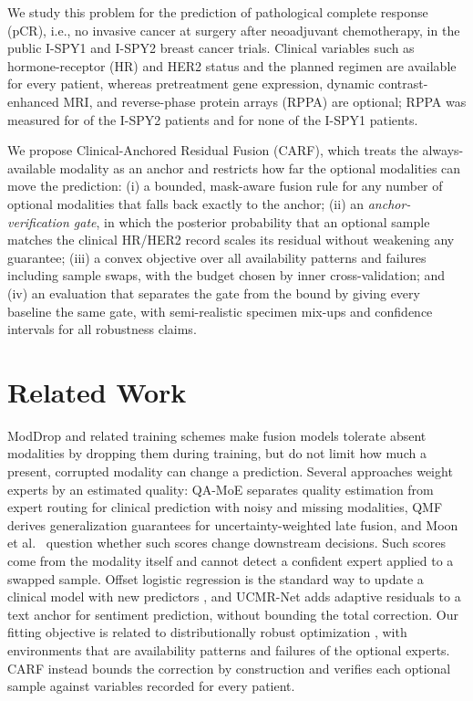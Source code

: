 \documentclass[a4paper,runningheads]{llncs}
\begin{document}
We study this problem for the prediction of pathological complete response (pCR), i.e., no invasive cancer at surgery after neoadjuvant chemotherapy, in the public I-SPY1 \cite{esserman2012} and I-SPY2 \cite{wolf2022ispy} breast cancer trials. Clinical variables such as hormone-receptor (HR) and HER2 status and the planned regimen are available for every patient, whereas pretreatment gene expression, dynamic contrast-enhanced MRI, and reverse-phase protein arrays (RPPA) are optional; RPPA was measured for \NRppa{} of the \NDev{} I-SPY2 patients and for none of the I-SPY1 patients.

We propose Clinical-Anchored Residual Fusion (CARF), which treats the always-available modality as an anchor and restricts how far the optional modalities can move the prediction: (i) a bounded, mask-aware fusion rule for any number of optional modalities that falls back exactly to the anchor; (ii) an \emph{anchor-verification gate}, in which the posterior probability that an optional sample matches the clinical HR/HER2 record scales its residual without weakening any guarantee; (iii) a convex objective over all availability patterns and failures including sample swaps, with the budget chosen by inner cross-validation; and (iv) an evaluation that separates the gate from the bound by giving every baseline the same gate, with semi-realistic specimen mix-ups and confidence intervals for all robustness claims.

\section{Related Work}

ModDrop \cite{neverova2015} and related training schemes \cite{ma2021smil} make fusion models tolerate absent modalities by dropping them during training, but do not limit how much a present, corrupted modality can change a prediction. Several approaches weight experts by an estimated quality: QA-MoE \cite{sun2026} separates quality estimation from expert routing for clinical prediction with noisy and missing modalities, QMF \cite{zhang2023qmf} derives generalization guarantees for uncertainty-weighted late fusion, and Moon et al.~\cite{moon2026} question whether such scores change downstream decisions. Such scores come from the modality itself and cannot detect a confident expert applied to a swapped sample. Offset logistic regression is the standard way to update a clinical model with new predictors \cite{janssen2008}, and UCMR-Net \cite{tang2026} adds adaptive residuals to a text anchor for sentiment prediction, without bounding the total correction. Our fitting objective is related to distributionally robust optimization \cite{sagawa2020}, with environments that are availability patterns and failures of the optional experts. CARF instead bounds the correction by construction and verifies each optional sample against variables recorded for every patient.
\end{document}
